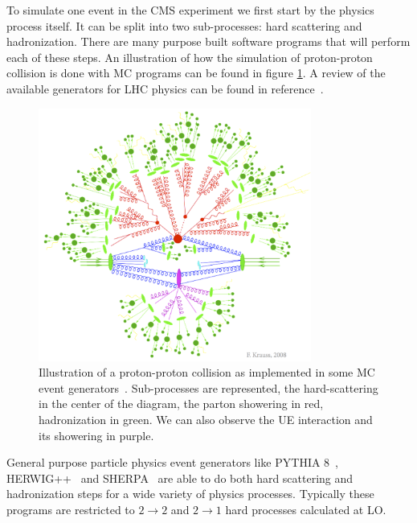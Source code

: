 
To simulate one event in the \gls{CMS} experiment we first start by the physics process itself. It can be split into two sub-processes: hard scattering and hadronization. There are many purpose built software programs that will perform each of these steps. An illustration of how the simulation of proton-proton collision is done with \gls{MC} programs can be found in figure \ref{FIGURE:EventReconstructionAndSimulation_MCShower}. A review of the available generators for \gls{LHC} physics can be found in reference~\cite{ARTICLE:GeneralPurposeEventGeneratorsForLHCPhysics}.

\begin{figure}[!htb]
\centering
\includegraphics[width=0.8\textwidth]{Chapter04/MonteCarlo/Images/MCShower.png}
\caption[Illustration a proton-proton collision as implemented in MC event generators.]{Illustration of a proton-proton collision as implemented in some MC event generators~\cite{IMAGEREF:krauss-diag}. Sub-processes are represented, the hard-scattering in the center of the diagram, the parton showering in red, hadronization in green. We can also observe the \gls{UE} interaction and its showering in purple.}
\label{FIGURE:EventReconstructionAndSimulation_MCShower}
\end{figure}

General purpose particle physics event generators like \textsc{PYTHIA 8}~\cite{ARTICLE:Pythia6p4PhysicsAndManual,ARTICLE:Pythia8p1Introduction}, \textsc{HERWIG++}~\cite{ARTICLE:HERWIGPhysicsAndManual} and \textsc{SHERPA}~\cite{ARTiCLE:SherpaEventGenerator} are able to do both hard scattering and hadronization steps for a wide variety of physics processes. Typically these programs are restricted to $2 \rightarrow 2$ and $2 \rightarrow 1$ hard processes calculated at \gls{LO}.

